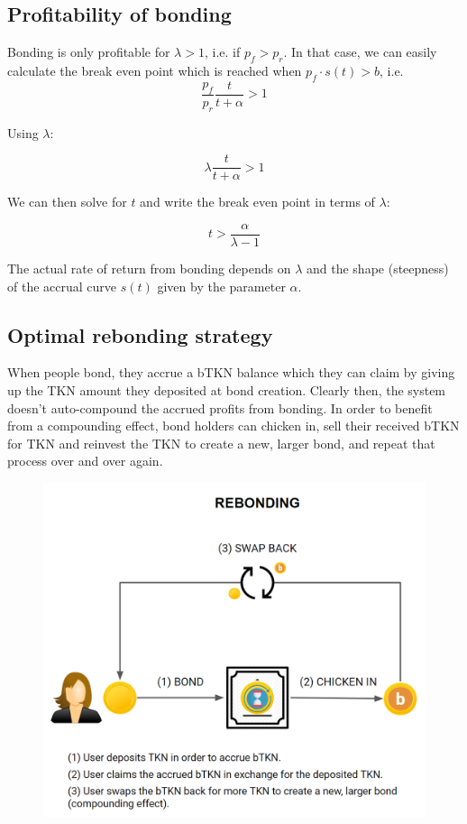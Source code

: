 \documentclass{article}
\begin{document}
\subsection{Profitability of bonding}
Bonding is only profitable for $\lambda>1$, i.e. if $p_f>p_r$. In that case, we can easily calculate the break even point which is reached when $p_f \cdot s(t)>b$, i.e.
\begin{equation}
  \label{eq:break_even_0}
\frac{p_f}{p_r}\frac{t}{t+\alpha} > 1
\end{equation}

Using $\lambda$:

\begin{equation}
  \label{eq:break_even_0}
\lambda\frac{t}{t+\alpha} > 1
\end{equation}

We can then solve for $t$ and write the break even point in terms of $\lambda$:

\begin{equation}
  \label{eq:break_even_2}
t > \frac{\alpha}{\lambda-1}
\end{equation}

The actual rate of return from bonding depends on $\lambda$ and the shape (steepness) of the accrual curve $s(t)$ given by the parameter $\alpha$.

\subsection{Optimal rebonding strategy}
  \label{sec:rebonding_strategy}
When people bond, they accrue a bTKN balance which they can claim by giving up the TKN amount they deposited at bond creation. Clearly then, the system doesn't auto-compound the accrued profits from bonding. In order to benefit from a compounding effect, bond holders can chicken in, sell their received bTKN for TKN and reinvest the TKN to create a new, larger bond, and repeat that process over and over again.

\begin{figure}[ht]
    \centering
    \includegraphics[width=0.5\linewidth]{./ChickenBonds_Whitepaper_rebonding_graphic.png}
\end{figure}
\end{document}
